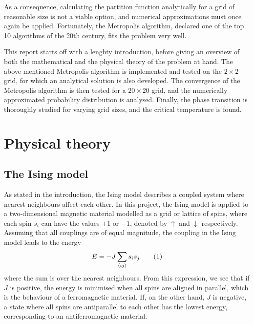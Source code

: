 \documentclass[12pt,english,a4paper]{article}
\newcommand{\eqtag}[1]{\refstepcounter{equation}\tag{\theequation}\label{#1}}
\begin{document}
As a consequence, calculating the partition function analytically for a grid of reasonable size is not a viable option, and numerical approximations must once again be applied. Fortunately, the Metropolis algorithm, declared one of the top 10 algorithms of the 20th century\autocite{top10algo}, fits the problem very well.

This report starts off with a lenghty introduction, before giving an overview of both the mathematical and the physical theory of the problem at hand. The above mentioned Metropolis algorithm is implemented and tested on the \(2\times2\) grid, for which an analytical solution is also developed. The convergence of the Metropolis algorithm is then tested for a \(20\times20\) grid, and the numerically approximated probability distribution is analysed. Finally, the phase transition is thoroughly studied for varying grid sizes, and the critical temperature is found.

\clearpage
\section{Physical theory}

\subsection{The Ising model}
As stated in the introduction, the Ising model describes a coupled system where nearest neighbours affect each other. In this project, the Ising model is applied to a two-dimensional magnetic material modelled as a grid or lattice of spins, where each spin \(s_i\) can have the values \(+1\) or \(-1\), denoted by \(\uparrow\) and \(\downarrow\) respectively. Assuming that all couplings are of equal magnitude, the coupling in the Ising model leads to the energy
\[
E = -J\sum_{\langle ij\rangle}s_is_j\eqtag{energy}
\]
where the sum is over the nearest neighbours. From this expression, we see that if \(J\) is positive, the energy is minimised when all spins are aligned in parallel, which is the behaviour of a ferromagnetic material. If, on the other hand, \(J\) is negative, a state where all spins are antiparallel to each other has the lowest energy, corresponding to an antiferromagnetic material.
\end{document}
